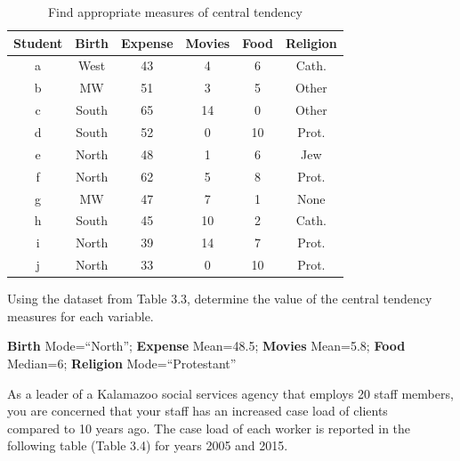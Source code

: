 \documentclass[11pt, chapterprefix=true]{scrbook}\usepackage[]{graphicx}\usepackage[]{color}
\begin{document}
\begin{exercises}
  \begin{exercise} %

\begin{table}[htbp]
   \centering
   \caption{Find appropriate measures of central tendency}
   {\tiny{
   \begin{tabular}{@{} cccccc  @{}} \hline %
   Student & Birth  & Expense & Movies & Food & Religion \\ \hline
   a & West  & 43 & 4 & 6 & Cath. \\
   b & MW  & 51 & 3 & 5 & Other \\
   c & South  & 65 & 14 & 0 & Other \\
   d & South  & 52 & 0 & 10 & Prot. \\
   e & North  & 48 & 1 & 6 & Jew \\
   f & North  & 62 & 5 & 8 & Prot. \\
   g & MW  & 47 & 7 & 1 & None \\
   h & South  & 45 & 10 & 2 & Cath. \\
   i & North  & 39 & 14 & 7 & Prot. \\
   j & North  & 33 & 0 & 10 & Prot. \\ \hline
   \end{tabular}
   }}
   \label{tab:t3_3a}
\end{table}

  Using the dataset from Table 3.3, determine the value of the central tendency measures for each variable.

  \end{exercise}
   \begin{solution}  %
  
     {\bf{Birth}} Mode=``North'';   {\bf{Expense}} Mean=48.5; {\bf{Movies}} Mean=5.8; {\bf{Food}} Median=6;  {\bf{Religion}} Mode=``Protestant''
   
   \end{solution}

  \begin{exercise} %

As a leader of a Kalamazoo social services agency that employs 20 staff members, you are concerned that your staff has an increased case load of clients \\ compared to 10 years ago.  The case load of each worker is reported in the following table (Table 3.4) for years 2005 and 2015.


\end{exercise}
\end{exercises}
\end{document}

